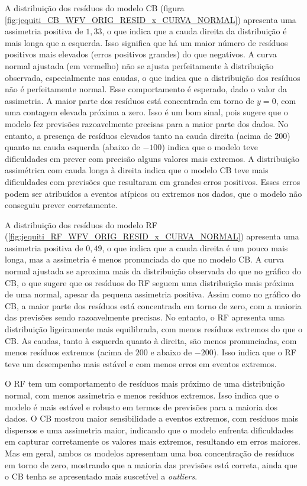 A distribuição dos resíduos do modelo CB (figura \ref{fig:jequiti_CB_WFV_ORIG_RESID_x_CURVA_NORMAL}) apresenta uma assimetria positiva de $1,33$, o que indica que a cauda direita da distribuição é mais longa que a esquerda. Isso significa que há um maior número de resíduos positivos mais elevados (erros positivos grandes) do que negativos. A curva normal ajustada (em vermelho) não se ajusta perfeitamente à distribuição observada, especialmente nas caudas, o que indica que a distribuição dos resíduos não é perfeitamente normal. Esse comportamento é esperado, dado o valor da assimetria. A maior parte dos resíduos está concentrada em torno de $y=0$, com uma contagem elevada próxima a zero. Isso é um bom sinal, pois sugere que o modelo fez previsões razoavelmente precisas para a maior parte dos dados.
No entanto, a presença de resíduos elevados tanto na cauda direita (acima de $200$) quanto na cauda esquerda (abaixo de $-100$) indica que o modelo teve dificuldades em prever com precisão alguns valores mais extremos. A distribuição assimétrica com cauda longa à direita indica que o modelo CB teve mais dificuldades com previsões que resultaram em grandes erros positivos. Esses erros podem ser atribuídos a eventos atípicos ou extremos nos dados, que o modelo não conseguiu prever corretamente.

A distribuição dos resíduos do modelo RF (\ref{fig:jequiti_RF_WFV_ORIG_RESID_x_CURVA_NORMAL}) apresenta uma assimetria positiva de $0,49$, o que indica que a cauda direita é um pouco mais longa, mas a assimetria é menos pronunciada do que no modelo CB. A curva normal ajustada se aproxima mais da distribuição observada do que no gráfico do CB, o que sugere que os resíduos do RF seguem uma distribuição mais próxima de uma normal, apesar da pequena assimetria positiva. Assim como no gráfico do CB, a maior parte dos resíduos está concentrada em torno de zero, com a maioria das previsões sendo razoavelmente precisas. No entanto, o RF apresenta uma distribuição ligeiramente mais equilibrada, com menos resíduos extremos do que o CB. As caudas, tanto à esquerda quanto à direita, são menos pronunciadas, com menos resíduos extremos (acima de $200$ e abaixo de $-200$). Isso indica que o RF teve um desempenho mais estável e com menos erros em eventos extremos.

O RF tem um comportamento de resíduos mais próximo de uma distribuição normal, com menos assimetria e menos resíduos extremos. Isso indica que o modelo é mais estável e robusto em termos de previsões para a maioria dos dados. O CB mostrou maior sensibilidade a eventos extremos, com resíduos mais dispersos e uma assimetria maior, indicando que o modelo enfrenta dificuldades em capturar corretamente os valores mais extremos, resultando em erros maiores. Mas em geral, ambos os modelos apresentam uma boa concentração de resíduos em torno de zero, mostrando que a maioria das previsões está correta, ainda que o CB tenha se apresentado mais suscetível a \textit{outliers}.


